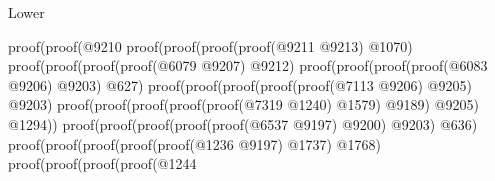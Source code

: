 \begin{lexlean}{Lower}
\begin{coremodule}
                                                  proof(proof(@9210
                                                        proof(proof(proof(proof(@9211 @9213) @1070)
                                                              proof(proof(proof(proof(@6079 @9207)
                                                                      @9212)
                                                                    proof(proof(proof(proof(@6083
                                                                              @9206)
                                                                            @9203)
                                                                          @627)
                                                                        proof(proof(proof(proof(proof(@7113
                                                                                    @9206)
                                                                                  @9205)
                                                                                @9203)
                                                                              proof(proof(proof(proof(proof(@7319
                                                                                          @1240)
                                                                                        @1579)
                                                                                      @9189)
                                                                                    @9205)
                                                                                  @1294))
                                                                            proof(proof(proof(proof(proof(@6537
                                                                                        @9197)
                                                                                      @9200)
                                                                                    @9203)
                                                                                  @636)
                                                                                proof(proof(proof(proof(proof(@1236
                                                                                            @9197)
                                                                                          @1737)
                                                                                        @1768)
                                                                                      proof(proof(proof(proof(@1244

\end{coremodule}
\end{lexlean}

